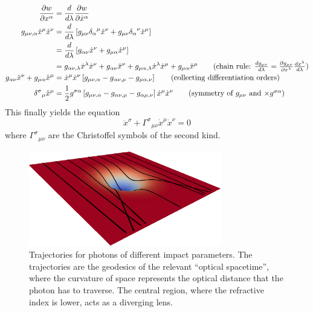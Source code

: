   \begin{align*}
  \frac{\partial w}{\partial x^\alpha}			&= \frac{d}{d\lambda}\frac{\partial w}{\partial\dot{x}^\alpha}	\\
  g_{\mu\nu,\alpha}\dot{x}^\mu\dot{x}^\nu		&= \frac{d}{d\lambda}\left[g_{\mu\nu}{\delta_\alpha}^\mu\dot{x}^\nu+g_{\mu\nu}{\delta_\alpha}^\nu\dot{x}^\mu\right]	\\
							&= \frac{d}{d\lambda}\left[g_{\alpha\nu}\dot{x}^\nu+g_{\mu\alpha}\dot{x}^\mu\right]					\\
							&= g_{\alpha\nu,\lambda}\dot{x}^\lambda\dot{x}^\nu+g_{\alpha\nu}\ddot{x}^\nu+g_{\mu\alpha,\lambda}\dot{x}^\lambda\dot{x}^\mu+g_{\mu\alpha}\ddot{x}^\mu \tag{chain rule: $\frac{dg_{\mu\nu}}{d\lambda}=\frac{\partial g_{\mu\nu}}{\partial x^\lambda}\frac{dx^\lambda}{d\lambda}$}	\\
  g_{\alpha\nu}\ddot{x}^\nu+g_{\mu\alpha}\ddot{x}^\mu	&= \dot{x}^\mu\dot{x}^\nu\left[g_{\mu\nu,\alpha}-g_{\alpha\nu,\mu}-g_{\mu\alpha,\nu}\right]	\tag{collecting differentiation orders}	\\
  {\delta^\sigma}_\mu\ddot{x}^\mu			&= \frac{1}{2}g^{\sigma\alpha}\left[g_{\mu\nu,\alpha}-g_{\alpha\nu,\mu}-g_{\alpha\mu,\nu}\right]\dot{x}^\mu\dot{x}^\nu	\tag{symmetry of $g_{\mu\nu}$ and $\times g^{\sigma\alpha}$}
  \end{align*}
This finally yields the equation
  \begin{equation}
   \ddot{x}^\sigma + {\Gamma^\sigma}_{\mu\nu}\dot{x}^\mu\dot{x}^\nu=0
  \end{equation}
where ${\Gamma^\sigma}_{\mu\nu}$ are the Christoffel symbols of the second kind. 

\begin{figure}
 \centering
 \includegraphics[width=0.75\textwidth]{figs/passive/geodesics-1.eps}
 \caption[Photon trajectories in a Gaussian deformation of the refractive index]
	  {Trajectories for photons of different impact parameters. The trajectories are
	  the geodesics of the relevant ``optical spacetime'', where the curvature of 
	  space represents the optical distance that the photon has to traverse. The central
	  region, where the refractive index is lower, acts as a diverging lens.}
\end{figure}


